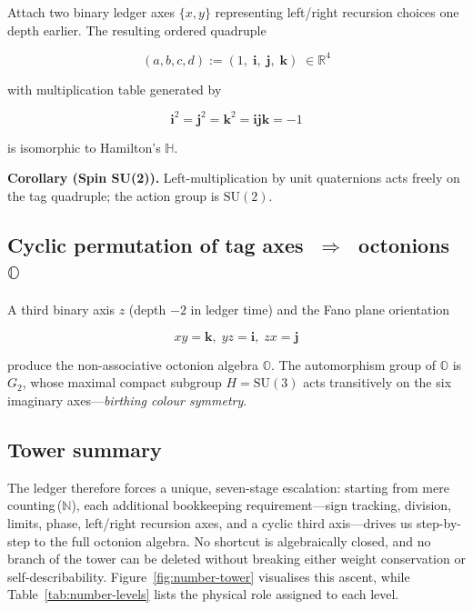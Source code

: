 Attach two binary ledger axes $\{x,y\}$ representing left/right recursion
choices one depth earlier.  The resulting ordered quadruple

\[
(a,b,c,d):=
(1,\; \mathbf i,\; \mathbf j,\; \mathbf k)\;\in\mathbb R^4
\]

with multiplication table generated by

\[
\mathbf i^2=\mathbf j^2=\mathbf k^2=\mathbf i\mathbf j\mathbf k=-1
\]

is isomorphic to Hamilton's $\mathbb H$.

\begin{axiombox}
\textbf{Corollary (Spin SU(2)).}
Left-multiplication by unit quaternions acts freely on the tag
quadruple; the action group is $\mathrm{SU}(2)$.
\end{axiombox}

\subsection{Cyclic permutation of tag axes $\;\Rightarrow\;$ octonions $\mathbb O$}

A third binary axis $z$ (depth $-2$ in ledger time) and the Fano plane
orientation

\[
xy=\mathbf k,\; yz=\mathbf i,\; zx=\mathbf j
\]

produce the non-associative octonion algebra $\mathbb O$.
The automorphism group of $\mathbb O$ is $G_2$, whose maximal compact
subgroup $H\!=\!\mathrm{SU}(3)$ acts transitively on the six imaginary
axes—\emph{birthing colour symmetry}.

\subsection{Tower summary}

The ledger therefore forces a unique, seven-stage escalation:
starting from mere counting\,($\mathbb N$), each additional bookkeeping
requirement—sign tracking, division, limits, phase, left/right recursion
axes, and a cyclic third axis—drives us step-by-step to the full octonion
algebra.  No shortcut is algebraically closed, and no branch of the tower
can be deleted without breaking either weight conservation or
self-describability.  Figure~\ref{fig:number-tower} visualises this ascent,
while Table~\ref{tab:number-levels} lists the physical role assigned to each
level.



